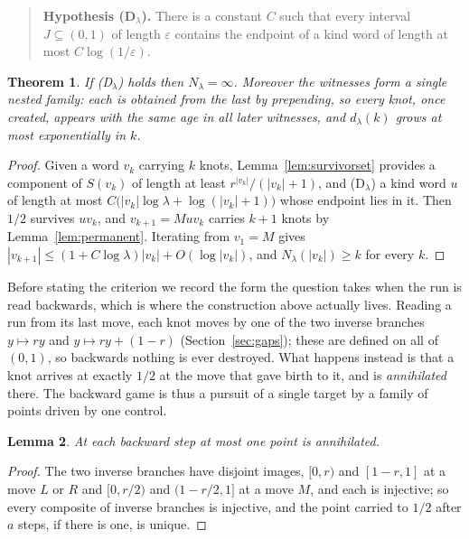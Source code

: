 \documentclass[11pt,reqno]{amsart}
\theoremstyle{plain}
\newtheorem{theorem}{Theorem}
\newtheorem{lemma}[theorem]{Lemma}
\theoremstyle{definition}
\theoremstyle{remark}
\begin{document}
\begin{quote}
\textbf{Hypothesis (D$_\lambda$).} There is a constant $C$ such that every
interval $J\subseteq(0,1)$ of length $\varepsilon$ contains the endpoint of a
kind word of length at most $C\log(1/\varepsilon)$.
\end{quote}

\begin{theorem}\label{thm:density}
If \textup{(D$_\lambda$)} holds then $N_\lambda=\infty$. Moreover the witnesses
form a single nested family: each is obtained from the last by prepending, so
every knot, once created, appears with the same age in all later witnesses,
and $d_\lambda(k)$ grows at most exponentially in $k$.
\end{theorem}

\begin{proof}
Given a word $v_k$ carrying $k$ knots, Lemma~\ref{lem:survivorset} provides a
component of $S(v_k)$ of length at least $r^{|v_k|}/(|v_k|+1)$, and
(D$_\lambda$) a kind word $u$ of length at most
$C\bigl(|v_k|\log\lambda+\log(|v_k|+1)\bigr)$ whose endpoint lies in it. Then
$1/2$ survives $uv_k$, and $v_{k+1}=Muv_k$ carries $k+1$ knots by
Lemma~\ref{lem:permanent}. Iterating from $v_1=M$ gives
$|v_{k+1}|\leq(1+C\log\lambda)|v_k|+O(\log|v_k|)$, and
$N_\lambda(|v_k|)\geq k$ for every $k$.
\end{proof}

Before stating the criterion we record the form the question takes when the
run is read backwards, which is where the construction above actually lives.
Reading a run from its last move, each knot moves by one of the two inverse
branches $y\mapsto ry$ and $y\mapsto ry+(1-r)$ (Section~\ref{sec:gaps}); these
are defined on all of $(0,1)$, so backwards nothing is ever destroyed. What
happens instead is that a knot arrives at exactly $1/2$ at the move that gave
birth to it, and is \emph{annihilated} there. The backward game is thus a
pursuit of a single target by a family of points driven by one control.

\begin{lemma}\label{lem:oneperstep}
At each backward step at most one point is annihilated.
\end{lemma}

\begin{proof}
The two inverse branches have disjoint images, $[0,r)$ and $[1-r,1]$ at a move
$L$ or $R$ and $[0,r/2)$ and $(1-r/2,1]$ at a move $M$, and each is injective;
so every composite of inverse branches is injective, and the point carried to
$1/2$ after $a$ steps, if there is one, is unique.
\end{proof}
\end{document}
